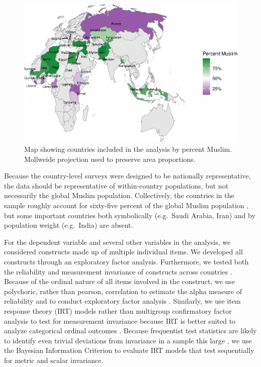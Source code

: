 \documentclass[10pt,letterpaper]{article}
\begin{document}
\begin{figure}[!h]
\centering
\includegraphics{figures/fig1.eps}
\caption{Map showing countries included in the analysis by percent
Muslim. Mollweide projection used to preserve area proportions.}
\label{fig:figure-world-map}
\end{figure}

Because the country-level surveys were designed to be nationally representative, the data should be representative of within-country populations, but not necessarily the global Muslim population. Collectively, the countries in the sample roughly account for sixty-five percent of the global Muslim population \cite{pewforumonreligionandpubliclife_global_2012}, but some important countries both symbolically (e.g.~Saudi Arabia, Iran) and by population weight (e.g.~India) are absent.

For the dependent variable and several other variables in the analysis, we considered constructs made up of multiple individual items. We developed all constructs through an exploratory factor analysis. Furthermore, we tested both the reliability and measurement invariance of constructs across countries \cite{vandevijver_methods_2021}. Because of the ordinal nature of all items involved in the construct, we use polychoric, rather than pearson, correlation to estimate the alpha measure of reliability and to conduct exploratory factor analysis \cite{gadermann_estimating_2012}. Similarly, we use item response theory (IRT) models rather than multigroup confirmatory factor analysis to test for measurement invariance because IRT is better suited to analyze categorical ordinal outcomes \cite{tay_overview_2015}. Because frequentist test statistics are likely to identify even trivial deviations from invariance in a sample this large \cite[p.~106]{vandevijver_methods_2021}, we use the Bayesian Information Criterion to evaluate IRT models that test sequentially for metric and scalar invariance.
\end{document}
